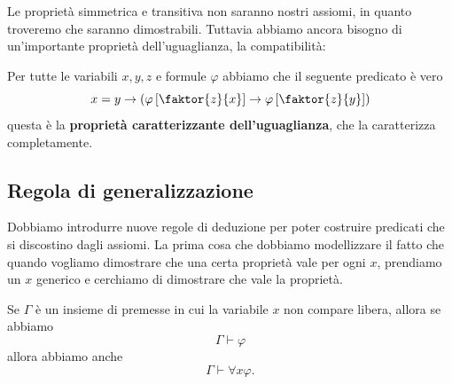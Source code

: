 \documentclass[11pt]{scrartcl}
\begin{document}
	Le proprietà simmetrica e transitiva non saranno nostri assiomi, in quanto troveremo che saranno dimostrabili. Tuttavia abbiamo ancora bisogno di un'importante proprietà dell'uguaglianza, la compatibilità:
	\begin{definition}
		Per tutte le variabili $x,y,z$ e formule $\varphi$ abbiamo che il seguente predicato è vero
		$$x=y\to \left(\varphi\left[\faktor{z}{x}\right]\to \varphi\left[\faktor{z}{y}\right]\right)$$
		questa è la \textbf{proprietà caratterizzante dell'uguaglianza}, che la caratterizza completamente.
	\end{definition}
	
	\subsection{Regola di generalizzazione}
	
	Dobbiamo introdurre nuove regole di deduzione per poter costruire predicati che si discostino dagli assiomi. La prima cosa che dobbiamo modellizzare il fatto che quando vogliamo dimostrare che una certa proprietà vale per ogni $x$, prendiamo un $x$ generico e cerchiamo di dimostrare che vale la proprietà.
	\begin{definition}
		Se $\Gamma$ è un insieme di premesse in cui la variabile $x$ non compare libera, allora se abbiamo
		$$\Gamma \vdash \varphi$$
		allora abbiamo anche
		$$\Gamma \vdash \forall x \varphi.$$
	\end{definition}
\end{document}
